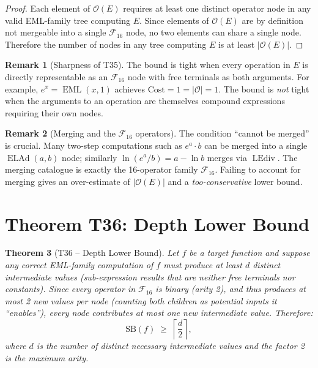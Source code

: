 \documentclass[12pt,a4paper]{article}
\newtheorem{theorem}{Theorem}[section]
\theoremstyle{definition}
\newtheorem{remark}[theorem]{Remark}
\newcommand{\EML}{\operatorname{EML}}
\newcommand{\ELAd}{\operatorname{ELAd}}
\newcommand{\LEdiv}{\operatorname{LEdiv}}
\newcommand{\Cost}{\mathrm{Cost}}
\newcommand{\SB}{\mathrm{SB}}
\newcommand{\Fam}{\mathcal{F}}
\begin{document}
\begin{proof}
Each element of $\mathcal{O}(E)$ requires at least one distinct operator node
in any valid EML-family tree computing $E$.  Since elements of $\mathcal{O}(E)$
are by definition not mergeable into a single $\Fam_{16}$ node, no two elements
can share a single node.  Therefore the number of nodes in any tree computing
$E$ is at least $|\mathcal{O}(E)|$.
\end{proof}

\begin{remark}[Sharpness of T35]\label{rem:T35sharp}
The bound is tight when every operation in $E$ is directly representable as an
$\Fam_{16}$ node with free terminals as both arguments.  For example,
$e^x = \EML(x,1)$ achieves $\Cost = 1 = |\mathcal{O}| = 1$.
The bound is \emph{not} tight when the arguments to an operation are themselves
compound expressions requiring their own nodes.
\end{remark}

\begin{remark}[Merging and the $\Fam_{16}$ operators]\label{rem:merging}
The condition ``cannot be merged'' is crucial.  Many two-step computations such
as $e^a \cdot b$ can be merged into a single $\ELAd(a,b)$ node; similarly
$\ln(e^a/b) = a - \ln b$ merges via $\LEdiv$.  The merging catalogue is
exactly the 16-operator family $\Fam_{16}$.  Failing to account for merging
gives an over-estimate of $|\mathcal{O}(E)|$ and a \emph{too-conservative}
lower bound.
\end{remark}

\section{Theorem T36: Depth Lower Bound}

\begin{theorem}[T36 -- Depth Lower Bound]\label{thm:T36}
Let $f$ be a target function and suppose any correct EML-family computation of
$f$ must produce at least $d$ distinct intermediate values (sub-expression
results that are neither free terminals nor constants).  Since every operator
in $\Fam_{16}$ is binary (arity 2), and thus produces at most 2 new values per
node (counting both children as potential inputs it ``enables''), every node
contributes at most one new intermediate value.  Therefore:
\[
  \SB(f) \;\geq\; \left\lceil \frac{d}{2} \right\rceil,
\]
where $d$ is the number of distinct necessary intermediate values and the
factor 2 is the maximum arity.
\end{theorem}
\end{document}
